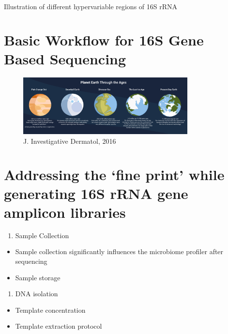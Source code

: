 \documentclass[
]{book}
\providecommand{\tightlist}{%
  \setlength{\itemsep}{0pt}\setlength{\parskip}{0pt}}
\begin{document}
Illustration of different hypervariable regions of 16S rRNA

\hypertarget{basic-workflow-for-16s-gene-based-sequencing}{%
\section{Basic Workflow for 16S Gene Based Sequencing}\label{basic-workflow-for-16s-gene-based-sequencing}}

\begin{figure}
\centering
\includegraphics[width=0.8\textwidth,height=\textheight]{./Figures/Planets.png}
\caption{J. Investigative Dermatol, 2016}
\end{figure}

\hypertarget{addressing-the-fine-print-while-generating-16s-rrna-gene-amplicon-libraries}{%
\section{Addressing the `fine print' while generating 16S rRNA gene amplicon libraries}\label{addressing-the-fine-print-while-generating-16s-rrna-gene-amplicon-libraries}}

\begin{enumerate}
\def\labelenumi{\arabic{enumi}.}
\tightlist
\item
  Sample Collection
\end{enumerate}

\begin{itemize}
\tightlist
\item
  Sample collection significantly influences the microbiome profiler
  after sequencing
\item
  Sample storage
\end{itemize}

\begin{enumerate}
\def\labelenumi{\arabic{enumi}.}
\setcounter{enumi}{1}
\tightlist
\item
  DNA isolation
\end{enumerate}

\begin{itemize}
\tightlist
\item
  Template concentration
\item
  Template extraction protocol
\end{itemize}
\end{document}
